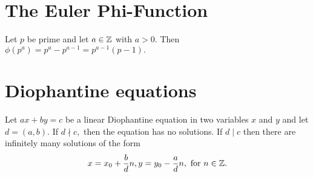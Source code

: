 \documentclass[letterpaper, 11 pt]{ximera}
\begin{document}
\section*{The Euler Phi-Function}

\begin{thm*}[Theorem 3.3]\label{thm:phi-prime-power}
    Let $p$ be prime and let $a\in\mathbb Z$ with $a>0.$ Then $\phi(p^a)=p^a-p^{a-1}=p^{a-1}(p-1).$
\end{thm*}
\section*{Diophantine equations}
\begin{thm*}[Theorem 6.2]\label{thm:linear-dioph}
Let $ax+by=c$ be a linear Diophantine equation in two variables $x$ and $y$ and let $d=(a,b).$ If $d\nmid c,$ then the equation has no solutions. If $d\mid c$ then there are infinitely many solutions of the form \[
            x=x_0+\frac{b}{d}n, y=y_0-\frac{a}{d}n, \text{ for } n\in\mathbb Z.
        \]
\end{thm*}
\end{document}
